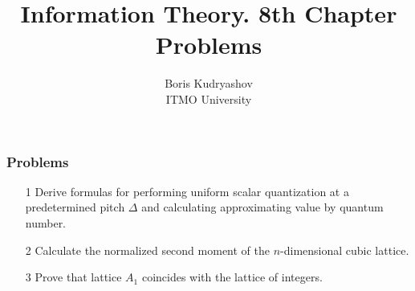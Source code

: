 \documentclass[14pt]{beamer}
\title{\small{Information Theory. 8th Chapter Problems}}
\author{\huge{
Boris Kudryashov \\
\vspace{30pt}
ITMO University
}}
\begin{document}
\maketitle


\begin{frame}
\frametitle{Problems}
\begin{enumerate}

    \item[1]
    Derive formulas for performing uniform scalar quantization at a predetermined pitch $\Delta$ and calculating approximating value by quantum number.

    \pause
    \item[2] 
    Calculate the normalized second moment of the $n$-dimensional cubic lattice.
  
    \pause
    \item[3]
    Prove that lattice $A_1$ coincides with the lattice of integers.

\end{enumerate}
\end{frame}
\end{document}
